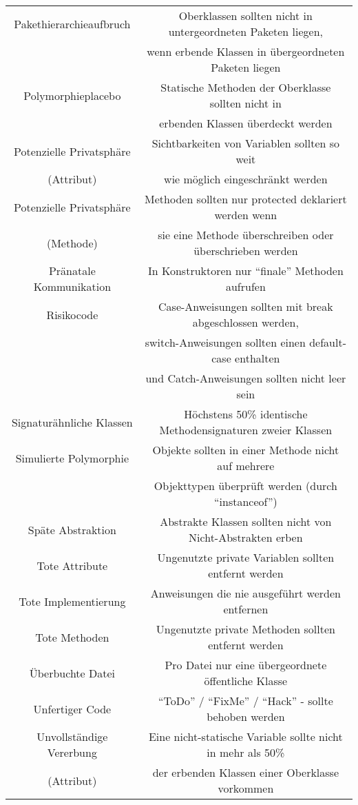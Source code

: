 \documentclass[da,ngerman]{stthesis}
\begin{document}
\begin{center}
\begin{longtabu}{|c|c|}
						\hline
						Pakethierarchieaufbruch & Oberklassen sollten nicht in untergeordneten Paketen liegen, \\ & wenn erbende Klassen in übergeordneten Paketen liegen \\
						\hline
						Polymorphieplacebo & Statische Methoden der Oberklasse sollten nicht in \\ & erbenden Klassen überdeckt werden \\
						\hline
						Potenzielle Privatsphäre & Sichtbarkeiten von Variablen sollten so weit \\ (Attribut) & wie möglich eingeschränkt werden \\
\hline
						Potenzielle Privatsphäre & Methoden sollten nur protected deklariert werden wenn \\ (Methode) & sie eine Methode überschreiben oder überschrieben werden \\
						\hline
						Pränatale Kommunikation & In Konstruktoren nur "`finale"' Methoden aufrufen \\
						\hline
						Risikocode & Case-Anweisungen sollten mit break abgeschlossen werden, \\ & switch-Anweisungen sollten einen default-case enthalten \\ & und Catch-Anweisungen sollten nicht leer sein \\
						\hline
						Signaturähnliche Klassen & Höchstens 50\% identische Methodensignaturen zweier Klassen \\
						\hline
						Simulierte Polymorphie & Objekte sollten in einer Methode nicht auf mehrere \\ & Objekttypen überprüft werden (durch "`instanceof"') \\
						\hline
						Späte Abstraktion & Abstrakte Klassen sollten nicht von Nicht-Abstrakten erben \\
						\hline
						Tote Attribute & Ungenutzte private Variablen sollten entfernt werden \\
						\hline
						Tote Implementierung & Anweisungen die nie ausgeführt werden entfernen \\
						\hline
						Tote Methoden & Ungenutzte private Methoden sollten entfernt werden \\
						\hline
						Überbuchte Datei & Pro Datei nur eine übergeordnete öffentliche Klasse \\
						\hline
						Unfertiger Code & "`ToDo"' / "`FixMe"' / "`Hack"' -  sollte behoben werden \\
						\hline
						Unvollständige Vererbung & Eine nicht-statische Variable sollte nicht in mehr als 50\% \\ (Attribut) & der erbenden Klassen einer Oberklasse vorkommen \\

\end{longtabu}
\end{center}
\end{document}
